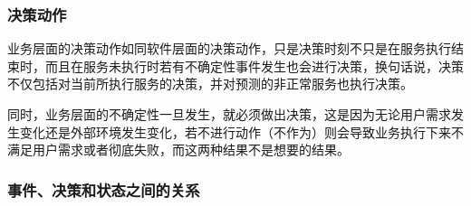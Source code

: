 \subsubsection{决策动作}

业务层面的决策动作如同软件层面的决策动作，只是决策时刻不只是在服务执行结束时，而且在服务未执行时若有不确定性事件发生也会进行决策，换句话说，决策不仅包括对当前所执行服务的决策，并对预测的非正常服务也执行决策。

同时，业务层面的不确定性一旦发生，就必须做出决策，这是因为无论用户需求发生变化还是外部环境发生变化，若不进行动作（不作为）则会导致业务执行下来不满足用户需求或者彻底失败，而这两种结果不是想要的结果。

\subsubsection{事件、决策和状态之间的关系}

%

%



